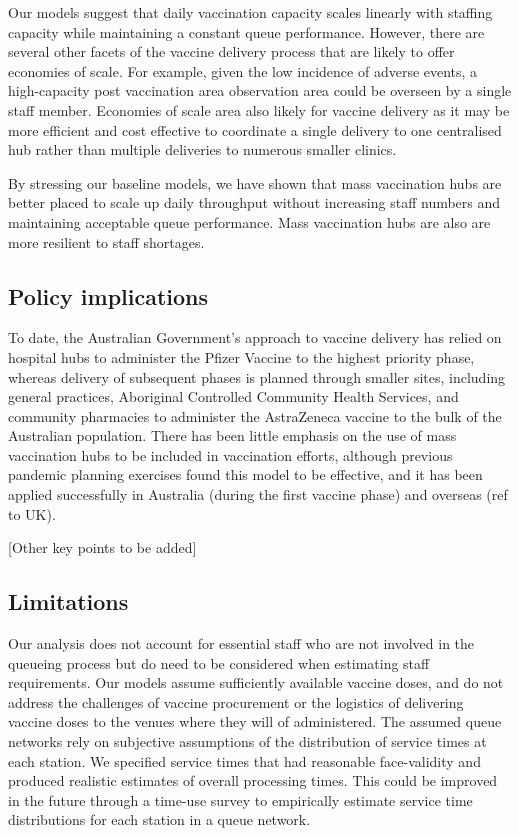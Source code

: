 \documentclass{article}
\begin{document}
Our models suggest that daily vaccination capacity scales linearly with
staffing capacity while maintaining a constant queue performance.
However, there are several other facets of the vaccine delivery process
that are likely to offer economies of scale. For example, given the low
incidence of adverse events, a high-capacity post vaccination area
observation area could be overseen by a single staff member. Economies
of scale area also likely for vaccine delivery as it may be more
efficient and cost effective to coordinate a single delivery to one
centralised hub rather than multiple deliveries to numerous smaller
clinics.

By stressing our baseline models, we have shown that mass vaccination
hubs are better placed to scale up daily throughput without increasing
staff numbers and maintaining acceptable queue performance. Mass
vaccination hubs are also are more resilient to staff shortages.

\hypertarget{policy-implications}{%
\subsection{Policy implications}\label{policy-implications}}

To date, the Australian Government's approach to vaccine delivery has
relied on hospital hubs to administer the Pfizer Vaccine to the highest
priority phase, whereas delivery of subsequent phases is planned through
smaller sites, including general practices, Aboriginal Controlled
Community Health Services, and community pharmacies to administer the
AstraZeneca vaccine to the bulk of the Australian population. There has
been little emphasis on the use of mass vaccination hubs to be included
in vaccination efforts, although previous pandemic planning exercises
found this model to be effective, and it has been applied successfully
in Australia (during the first vaccine phase) and overseas (ref to UK).

{[}Other key points to be added{]}

\hypertarget{limitations}{%
\subsection{Limitations}\label{limitations}}

Our analysis does not account for essential staff who are not involved
in the queueing process but do need to be considered when estimating
staff requirements. Our models assume sufficiently available vaccine
doses, and do not address the challenges of vaccine procurement or the
logistics of delivering vaccine doses to the venues where they will of
administered. The assumed queue networks rely on subjective assumptions
of the distribution of service times at each station. We specified
service times that had reasonable face-validity and produced realistic
estimates of overall processing times. This could be improved in the
future through a time-use survey to empirically estimate service time
distributions for each station in a queue network.
\end{document}
